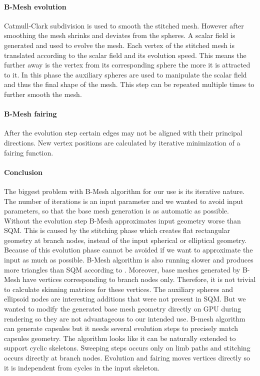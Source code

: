 \paragraph{B-Mesh evolution}
Catmull-Clark subdivision is used to smooth the stitched mesh. However after smoothing the mesh shrinks and deviates from the spheres. A scalar field is generated and used to evolve the mesh. Each vertex of the stitched mesh is translated according to the scalar field and its evolution speed. This means the further away is the vertex from its corresponding sphere the more it is attracted to it. In this phase the auxiliary spheres are used to manipulate the scalar field and thus the final shape of the mesh. This step can be repeated multiple times to further smooth the mesh.

\paragraph{B-Mesh fairing}
After the evolution step certain edges may not be aligned with their principal directions. New vertex positions are calculated by iterative minimization of a fairing function.

\paragraph{Conclusion}
The biggest problem with B-Mesh algorithm for our use is its iterative nature. The number of iterations is an input parameter and we wanted to avoid input parameters, so that the base mesh generation is as automatic as possible. Without the evolution step B-Mesh approximates input geometry worse than SQM. This is caused by the stitching phase which creates flat rectangular geometry at branch nodes, instead of the input spherical or elliptical geometry. Because of this evolution phase cannot be avoided if we want to approximate the input as much as possible.
B-Mesh algorithm is also running slower and produces more triangles than SQM according to \cite{sqm}.
Moreover, base meshes generated by B-Mesh have vertices corresponding to branch nodes only.
Therefore, it is not trivial to calculate skinning matrices for these vertices.
The auxiliary spheres and ellipsoid nodes are interesting additions that were not present in SQM. But we wanted to modify the generated base mesh geometry directly on GPU during rendering so they are not advantageous to our intended use. B-mesh algorithm can generate capsules but it needs several evolution steps to precisely match capsules geometry. The algorithm looks like it can be naturally extended to support cyclic skeletons. Sweeping steps occurs only on limb paths and stitching occurs directly at branch nodes. Evolution and fairing moves vertices directly so it is independent from cycles in the input skeleton.

